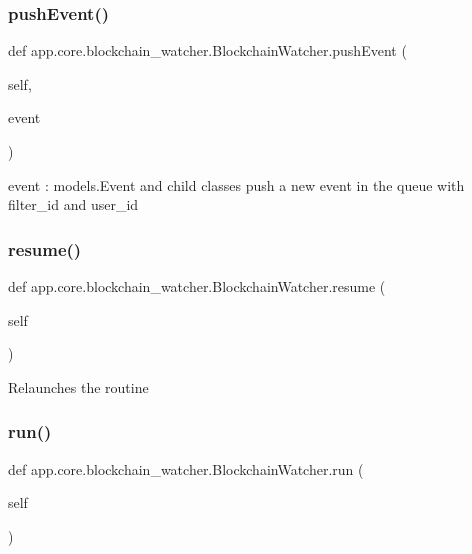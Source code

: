 \subsubsection{\texorpdfstring{push\+Event()}{pushEvent()}}
{\footnotesize\ttfamily def app.\+core.\+blockchain\+\_\+watcher.\+Blockchain\+Watcher.\+push\+Event (\begin{DoxyParamCaption}\item[{}]{self,  }\item[{}]{event }\end{DoxyParamCaption})}

\begin{DoxyVerb}event : models.Event and child classes
push a new event in the queue with filter_id and user_id
\end{DoxyVerb}
 \mbox{\label{classapp_1_1core_1_1blockchain__watcher_1_1_blockchain_watcher_a86bf292f6c15d634ba31825fae29a6e2}} 
\subsubsection{\texorpdfstring{resume()}{resume()}}
{\footnotesize\ttfamily def app.\+core.\+blockchain\+\_\+watcher.\+Blockchain\+Watcher.\+resume (\begin{DoxyParamCaption}\item[{}]{self }\end{DoxyParamCaption})}

\begin{DoxyVerb}Relaunches the routine
\end{DoxyVerb}
 \mbox{\label{classapp_1_1core_1_1blockchain__watcher_1_1_blockchain_watcher_a91c1a75611393e857f79ea5125e4e182}} 
\subsubsection{\texorpdfstring{run()}{run()}}
{\footnotesize\ttfamily def app.\+core.\+blockchain\+\_\+watcher.\+Blockchain\+Watcher.\+run (\begin{DoxyParamCaption}\item[{}]{self }\end{DoxyParamCaption})}

